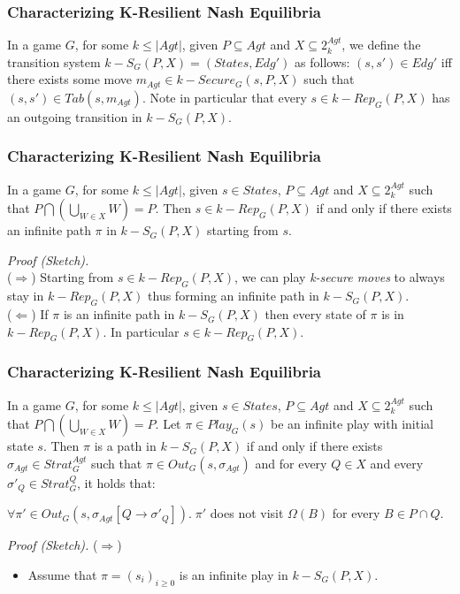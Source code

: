 \documentclass{beamer}
\begin{document}
\begin{frame}
\frametitle{Characterizing K-Resilient Nash Equilibria}
\begin{definition}
In a game $G$, for some $k \leq \vert Agt \vert$, given $P \subseteq Agt$ and $X \subseteq 2^{Agt}_{k}$, we define the transition system $k-S_{G}(P, X) = (States, Edg')$ as follows: $(s, s') \in Edg'$ iff there exists some move $m_{Agt} \in k-Secure_{G}(s, P, X)$ such that $(s, s') \in Tab(s, m_{Agt})$. Note in particular that every $s \in k-Rep_{G}(P, X)$ has an outgoing transition in $k-S_{G}(P, X)$.
\end{definition}
\end{frame}

\begin{frame}
\frametitle{Characterizing K-Resilient Nash Equilibria}
\begin{lemma}[3]
In a game $G$, for some $k \leq \vert Agt \vert$, given $s \in States$, $P \subseteq Agt$ and $X \subseteq 2^{Agt}_{k}$ such that $P \bigcap \left( \bigcup \limits_{W \in X}W \right) = P$. Then $s \in k-Rep_{G}(P, X)$ if and only if there exists an infinite path $\pi$ in $k-S_{G}(P, X)$ starting from $s$.
\end{lemma}
\textit{Proof (Sketch).}\\($\Rightarrow$) Starting from $s \in k-Rep_{G}(P, X)$, we can play \textit{k-secure moves} to always stay in $k-Rep_{G}(P, X)$ thus forming an infinite path in $k-S_{G}(P, X)$.\\
($\Leftarrow$) If $\pi$ is an infinite path in $k-S_{G}(P, X)$ then every state of $\pi$ is in $k-Rep_{G}(P, X)$. In particular $s \in k-Rep_{G}(P, X)$.
\end{frame}

\begin{frame}
\frametitle{Characterizing K-Resilient Nash Equilibria}
\begin{lemma}[4]
In a game $G$, for some $k \leq \vert Agt \vert$, given $s \in States$, $P \subseteq Agt$ and $X \subseteq 2^{Agt}_{k}$ such that $P \bigcap \left( \bigcup \limits_{W \in X}W \right) = P$. Let $\pi \in Play_{G}(s)$ be an infinite play with initial state $s$. Then $\pi$ is a path in $k-S_{G}(P, X)$ if and only if there exists $\sigma_{Agt} \in Strat^{Agt}_{G}$ such that $\pi \in Out_{G}(s, \sigma_{Agt})$ and for every $Q \in X$ and every $\sigma'_{Q} \in Strat^{Q}_{G}$, it holds that:

$\forall \pi' \in Out_{G}(s, \sigma_{Agt}[Q \rightarrow \sigma'_{Q}]). \; \pi'$ does not visit $\Omega(B)$ for every $B \in P \cap Q$.
\end{lemma}
\textit{Proof (Sketch).} ($\Rightarrow$) 
\begin{itemize}
\item Assume that $\pi = (s_{i})_{i\geq 0}$ is an infinite play in $k-S_{G}(P, X)$.
\end{itemize}
\end{frame}
\end{document}
